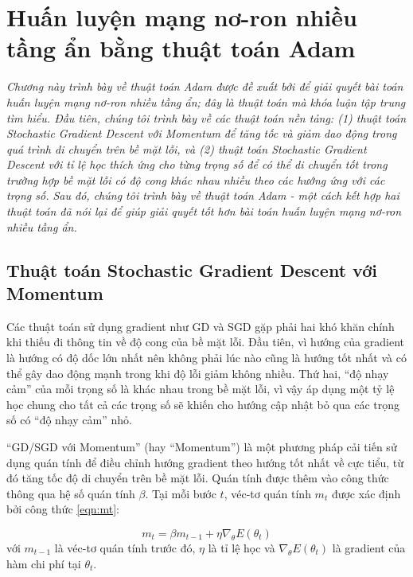 \chapter{Huấn luyện mạng nơ-ron nhiều tầng ẩn bằng thuật toán Adam}
\label{Chapter3}

\textit{Chương này trình bày về thuật toán Adam được đề xuất bởi \cite{kingma2014adam} để giải quyết bài toán huấn luyện mạng nơ-ron nhiều tầng ẩn; đây là thuật toán mà khóa luận tập trung tìm hiểu. Đầu tiên, chúng tôi trình bày về các thuật toán nền tảng: (1) thuật toán Stochastic Gradient Descent với Momentum để tăng tốc và giảm dao động trong quá trình di chuyển trên bề mặt lỗi, và (2) thuật toán Stochastic Gradient Descent với tỉ lệ học thích ứng cho từng trọng số để có thể di chuyển tốt trong trường hợp bề mặt lỗi có độ cong khác nhau nhiều theo các hướng ứng với các trọng số. Sau đó, chúng tôi trình bày về thuật toán Adam - một cách kết hợp hai thuật toán đã nói lại để giúp giải quyết tốt hơn bài toán huấn luyện mạng nơ-ron nhiều tầng ẩn.}

\section{Thuật toán Stochastic Gradient Descent với Momentum}

Các thuật toán sử dụng gradient như GD và SGD gặp phải hai khó khăn chính khi thiếu đi thông tin về độ cong của bề mặt lỗi. Đầu tiên, vì hướng của gradient là hướng có độ dốc lớn nhất nên không phải lúc nào cũng là hướng tốt nhất và có thể gây dao động mạnh trong khi độ lỗi giảm không nhiều. Thứ hai, ``độ nhạy cảm'' của mỗi trọng số là khác nhau trong bề mặt lỗi, vì vậy áp dụng một tỷ lệ học chung cho tất cả các trọng số sẽ khiến cho hướng cập nhật bỏ qua các trọng số có ``độ nhạy cảm'' nhỏ.

``GD/SGD với Momentum'' (hay ``Momentum'') là một phương pháp cải tiến sử dụng quán tính để điều chỉnh hướng gradient theo hướng tốt nhất về cực tiểu, từ đó tăng tốc độ di chuyển trên bề mặt lỗi. Quán tính được thêm vào công thức thông qua hệ số quán tính $\beta$. Tại mỗi bước $t$, véc-tơ quán tính $m_t$ được xác định bởi công thức \ref{eqn:mt}:

\begin{equation}
	\label{eqn:mt}
	m_t = \beta m_{t-1} + \eta\nabla_\theta E(\theta_t)
\end{equation}
với $m_{t-1}$ là véc-tơ quán tính trước đó, $\eta$ là tỉ lệ học và $\nabla_\theta E(\theta_t)$ là gradient của hàm chi phí tại $\theta_t$.

